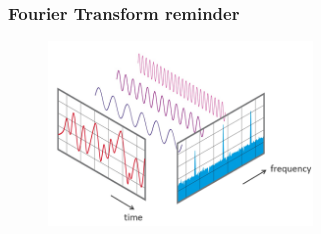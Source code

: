 \documentclass{beamer} %
\begin{document}

\begin{frame}
	\frametitle{Fourier Transform reminder}
	\begin{figure}
		\centering
		\includegraphics[width=7cm]{FFT-Time-Frequency-View.png}
	\end{figure}
\end{frame}


\end{document}
